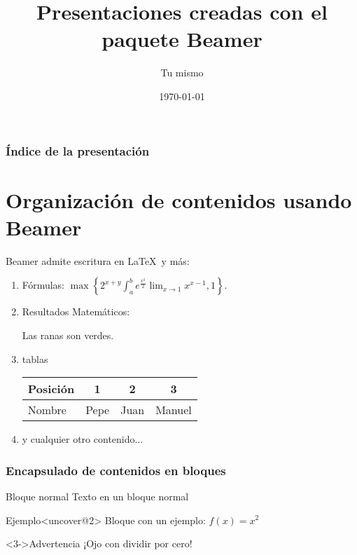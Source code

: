 \documentclass{beamer}
\title{Presentaciones creadas con el paquete Beamer}
\author{Tu mismo}
\date{\today}
\begin{document}
%
\begin{frame}
\titlepage
\end{frame}
%
\begin{frame}
\frametitle{Índice de la presentación}
\tableofcontents
\end{frame}
%
\section{Organización de contenidos usando Beamer}
%
%
\begin{frame}{Beamer admite escritura en \LaTeX\ y más:}
\begin{enumerate}
\item Fórmulas: 
$\max\left\{2^{x+y}\int_a^b e^{\frac{x^2}{2}}\lim_{x\to 1}x^{x-1},1\right\}.$
\item Resultados Matemáticos:
\begin{theorem}\label{tonto}
Las ranas son verdes.
\end{theorem}
\item tablas
\begin{tabular}{|l|c|c|c|} \hline
Posición & 1 & 2 & 3 \\ \hline \hline
Nombre & Pepe & Juan & Manuel\\ \hline
\end{tabular}
\item y cualquier otro contenido...
\end{enumerate}
\end{frame}

\begin{frame}
\frametitle{Encapsulado de contenidos en bloques}
\begin{block}{Bloque normal}
Texto en un bloque normal
\end{block}
%
\begin{exampleblock}{Ejemplo}<uncover@2>
Bloque con un ejemplo: $f(x) = x^2$
\end{exampleblock}
%
\begin{alertblock}<3->{Advertencia}
¡Ojo con dividir por cero!
\end{alertblock}
\end{frame}
\end{document}
